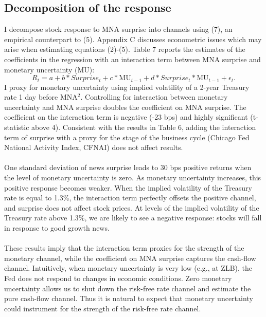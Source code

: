 \documentclass[12pt]{article}
\begin{document}
\subsection{Decomposition of the response} \label{sec:Model}

I decompose stock response to MNA surprise into channels using (7), an empirical counterpart to (5). Appendix C discusses econometric issues which may arise when estimating equations (2)-(5). Table 7 reports the estimates of the coefficients in the regression with an interaction term between MNA surprise and monetary uncertainty (MU):
\begin{equation}
    R_t = a + b*Surprise_t + c*\text{MU}_{t-1} + d*Surprise_t*\text{MU}_{t-1} + \epsilon_t.
\end{equation}
I proxy for monetary uncertainty using implied volatility of a 2-year Treasury rate 1 day before MNA$^2$. Controlling for interaction between monetary uncertainty and MNA surprise doubles the coefficient on MNA surprise. The coefficient on the interaction term is negative (-23 bps) and highly significant (t-statistic above 4). Consistent with the results in Table 6, adding the interaction term of surprise with a proxy for the stage of the business cycle (Chicago Fed National Activity Index, CFNAI) does not affect results.
\paragraph{}
One standard deviation of news surprise leads to 30 bps positive returns when the level of monetary uncertainty is zero. As monetary uncertainty increases, this positive response becomes weaker. When the implied volatility of the Treasury rate is equal to 1.3\%, the interaction term perfectly offsets the positive channel, and surprise does not affect stock prices. At levels of the implied volatility of the Treasury rate above 1.3\%, we are likely to see a negative response: stocks will fall in response to good growth news. 
\paragraph{}
These results imply that the interaction term proxies for the strength of the monetary channel, while the coefficient on MNA surprise captures the cash-flow channel. Intuitively, when monetary uncertainty is very low (e.g., at ZLB), the Fed does not respond to changes in economic conditions. Zero monetary uncertainty allows us to shut down the risk-free rate channel and estimate the pure cash-flow channel. Thus it is natural to expect that monetary uncertainty could instrument for the strength of the risk-free rate channel.
\end{document}
